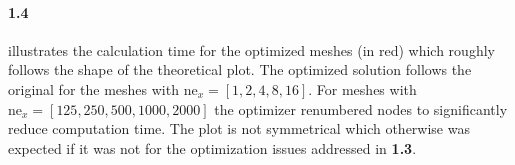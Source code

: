 \squeezeup
\paragraph{1.4}  illustrates the calculation time for the optimized meshes (in red) which roughly follows the shape of the theoretical plot. The optimized solution follows the original for the meshes with $\text{ne}_x=[1,2,4,8,16]$. For meshes with $\text{ne}_x=[125,250,500,1000,2000]$ the optimizer renumbered nodes to significantly reduce computation time. The plot is not symmetrical which otherwise was expected if it was not for the optimization issues addressed in \textbf{1.3}.








